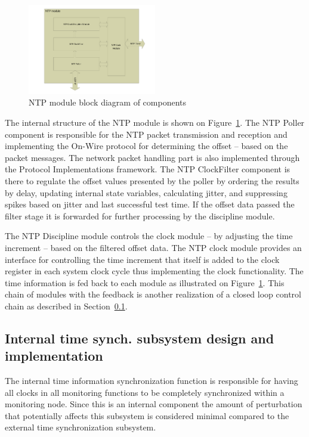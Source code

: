 \documentclass[article]{IEEEtran}
\begin{document}
\begin{figure}[!htb]
    \centering
    \includegraphics[width=0.5\textwidth]{figures_raw/ntp-sketch.pdf}
    \caption{NTP module block diagram of components}
    \label{fig:ntp-impl}
\end{figure}

The internal structure of the NTP module is shown on Figure~\ref{fig:ntp-impl}. The NTP Poller component is responsible for the NTP packet transmission and reception and implementing the On-Wire protocol 
for determining the offset  -- based on the packet messages. The network packet handling part is also implemented through the Protocol Implementations framework. The NTP ClockFilter component is there to regulate the offset values presented by the poller by ordering the results by delay, updating internal state variables, calculating jitter, and suppressing spikes based on jitter and last successful test time. If the offset data passed the filter stage it is forwarded for further processing by the discipline module.

The NTP Discipline module controls the clock module -- by adjusting the time increment -- based on the filtered offset data. The NTP clock module provides an interface for controlling the time increment that itself is added to the clock register in each system clock cycle thus 
implementing the clock functionality. The time information is fed back to each module as illustrated on Figure~\ref{fig:ntp-impl}.
This chain of modules with the feedback is another realization of a closed loop control chain as described in Section~\ref{sec:Internal-Impl}.

\subsection{Internal time synch. subsystem design and implementation}\label{sec:Internal-Impl}

The internal time information synchronization function is responsible for having all clocks in all monitoring functions
to be completely synchronized within a monitoring node. Since this is an internal component the amount of perturbation 
that potentially affects this subsystem is considered minimal compared to the external time synchronization subsystem.
\end{document}
